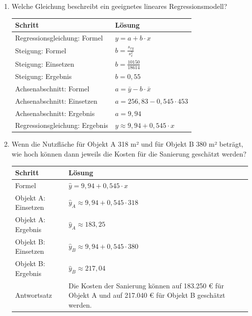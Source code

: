 \documentclass[
  11pt,
  ngerman,
  a4paper,
]{report}
\begin{document}
\begin{enumerate}
\def\labelenumi{\alph{enumi})}
\item
  Welche Gleichung beschreibt ein geeignetes lineares Regressionsmodell?

  \begin{table}[H]
   \centering
   \begin{tabular}{ll}
   \toprule
   \textbf{Schritt} & \textbf{Lösung}\\
   \midrule
   Regressionsgleichung: Formel & $y=a + b \cdot x$\\
   Steigung: Formel & $b=\frac{s_{xy}}{s^2_x}$\\
   Steigung: Einsetzen & $b=\frac{10150}{18614}$\\
   Steigung: Ergebnis & $b=0{,}55$\\
   Achsenabschnitt: Formel & $a=\bar{y}-b\cdot\bar{x}$\\
   Achsenabschnitt: Einsetzen & $a=256{,}83-0{,}545\cdot453$\\
   Achsenabschnitt: Ergebnis & $a=9{,}94$\\
   Regressionsgleichung: Ergebnis & $y \approx 9{,}94 + 0{,}545 \cdot x$\\
   \bottomrule
   \end{tabular}
   \end{table}
\item
  Wenn die Nutzfläche für Objekt A 318 m² und für Objekt B 380 m² beträgt, wie hoch können dann jeweils die Kosten für die Sanierung geschätzt werden?

  \begin{table}[H]
   \centering
   \begin{tabular}{ll}
   \toprule
   \textbf{Schritt} & \textbf{Lösung}\\
   \midrule
   Formel & $\hat{y}= 9{,}94 + 0{,}545 \cdot x$\\
   Objekt A: Einsetzen & $\hat{y}_{A}\approx 9{,}94 + 0{,}545 \cdot 318$\\
   Objekt A: Ergebnis & $\hat{y}_{A}\approx183{,}25$\\
   Objekt B: Einsetzen & $\hat{y}_{B}\approx 9{,}94 + 0{,}545 \cdot 380$\\
   Objekt B: Ergebnis & $\hat{y}_{B}\approx217{,}04$\\
   Antwortsatz & Die Kosten der Sanierung können auf 183.250 € für Objekt A und auf 217.040 € für Objekt B geschätzt werden.\\
   \bottomrule
   \end{tabular}
   \end{table}
\end{enumerate}
\end{document}
